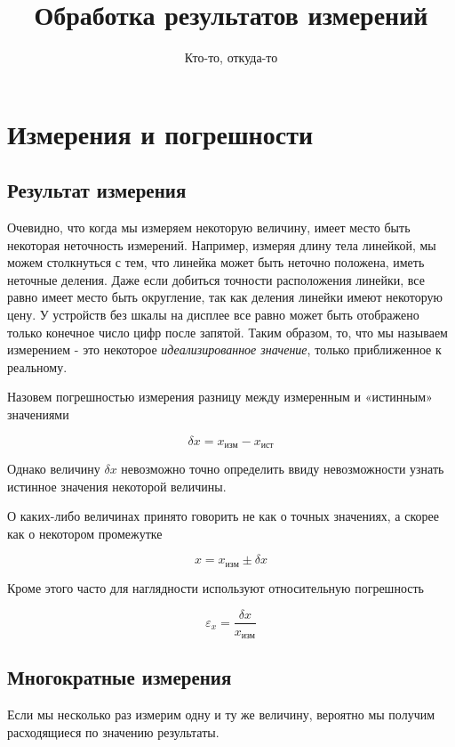 \documentclass[12pt]{article}
\author{Кто-то, откуда-то}            %
\title{Обработка результатов измерений}
\begin{document}
  \maketitle


  \section{Измерения и погрешности}

    \subsection{Результат измерения}

      Очевидно, что когда мы измеряем некоторую величину, имеет место быть некоторая
      неточность измерений. Например, измеряя длину тела линейкой, мы можем столкнуться
      с тем, что линейка может быть неточно положена, иметь неточные деления.
      Даже если добиться точности расположения линейки, все равно имеет место быть округление,
      так как деления линейки имеют некоторую цену. У устройств без шкалы на дисплее
      все равно может быть отображено только конечное число цифр после запятой.
      Таким образом, то, что мы называем измерением - это некоторое \textit{идеализированное значение},
      только приближенное к реальному.

      Назовем погрешностью измерения разницу между измеренным и «истинным» значениями

      $$
        \delta x = x_{изм} - x_{ист}
      $$

      Однако величину $\delta x$ невозможно точно определить ввиду невозможности
      узнать истинное значения некоторой величины.

      О каких-либо величинах принято говорить не как о точных значениях, а скорее
      как о некотором промежутке

      $$
        x = x_{изм} \pm \delta x
      $$

      Кроме этого часто для наглядности используют относительную погрешность

      $$
        \varepsilon_x = \frac{\delta x}{x_{изм}}
      $$

    \subsection{Многократные измерения}

      Если мы несколько раз измерим одну и ту же величину, вероятно мы получим
      расходящиеся по значению результаты.
\end{document}
